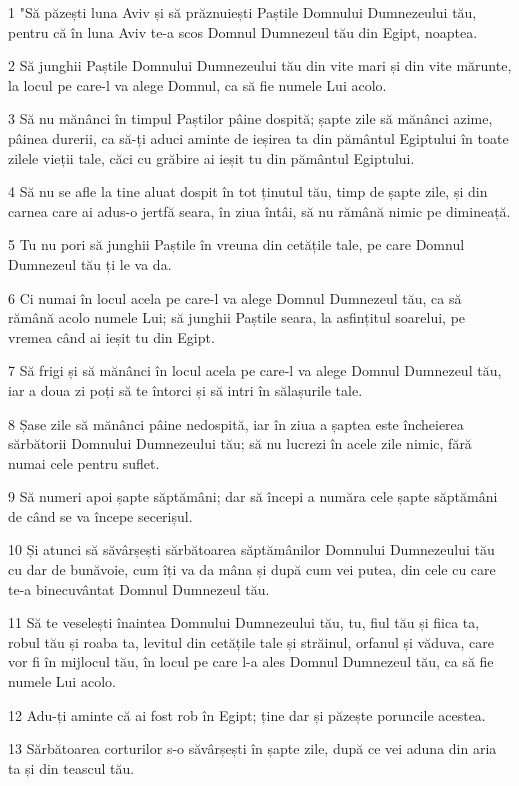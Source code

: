 \par 1 "Să păzești luna Aviv și să prăznuiești Paștile Domnului Dumnezeului tău, pentru că în luna Aviv te-a scos Domnul Dumnezeul tău din Egipt, noaptea.
\par 2 Să junghii Paștile Domnului Dumnezeului tău din vite mari și din vite mărunte, la locul pe care-l va alege Domnul, ca să fie numele Lui acolo.
\par 3 Să nu mănânci în timpul Paștilor pâine dospită; șapte zile să mănânci azime, pâinea durerii, ca să-ți aduci aminte de ieșirea ta din pământul Egiptului în toate zilele vieții tale, căci cu grăbire ai ieșit tu din pământul Egiptului.
\par 4 Să nu se afle la tine aluat dospit în tot ținutul tău, timp de șapte zile, și din carnea care ai adus-o jertfă seara, în ziua întâi, să nu rămână nimic pe dimineață.
\par 5 Tu nu pori să junghii Paștile în vreuna din cetățile tale, pe care Domnul Dumnezeul tău ți le va da.
\par 6 Ci numai în locul acela pe care-l va alege Domnul Dumnezeul tău, ca să rămână acolo numele Lui; să junghii Paștile seara, la asfințitul soarelui, pe vremea când ai ieșit tu din Egipt.
\par 7 Să frigi și să mănânci în locul acela pe care-l va alege Domnul Dumnezeul tău, iar a doua zi poți să te întorci și să intri în sălașurile tale.
\par 8 Șase zile să mănânci pâine nedospită, iar în ziua a șaptea este încheierea sărbătorii Domnului Dumnezeului tău; să nu lucrezi în acele zile nimic, fără numai cele pentru suflet.
\par 9 Să numeri apoi șapte săptămâni; dar să începi a număra cele șapte săptămâni de când se va începe secerișul.
\par 10 Și atunci să săvârșești sărbătoarea săptămânilor Domnului Dumnezeului tău cu dar de bunăvoie, cum îți va da mâna și după cum vei putea, din cele cu care te-a binecuvântat Domnul Dumnezeul tău.
\par 11 Să te veselești înaintea Domnului Dumnezeului tău, tu, fiul tău și fiica ta, robul tău și roaba ta, levitul din cetățile tale și străinul, orfanul și văduva, care vor fi în mijlocul tău, în locul pe care l-a ales Domnul Dumnezeul tău, ca să fie numele Lui acolo.
\par 12 Adu-ți aminte că ai fost rob în Egipt; ține dar și păzește poruncile acestea.
\par 13 Sărbătoarea corturilor s-o săvârșești în șapte zile, după ce vei aduna din aria ta și din teascul tău.
